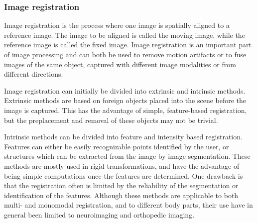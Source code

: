 
\subsubsection{Image registration}
Image registration is the process where one image is spatially aligned to a reference image. The image to be aligned is called the moving image, while the reference image is called the fixed image. Image registration  is an important part of image processing and can both be used to remove motion artifacts or to fuse images of the same object, captured with different image modalities or from different directions. 

Image registration can initially be divided into extrinsic and intrinsic methods. Extrinsic methods are based on foreign objects placed into the scene before the image is captured. This has the advantage of simple, feature-based registration, but the preplacement and removal of these objects may not be trivial. 

Intrinsic methods can be divided into feature and intensity based registration. Features can either be easily recognizable points identified by the user, or structures which can be extracted from the image by image segmentation. These methods are mostly used in rigid transformations, and have the advantage of being simple computations once the features are determined. One drawback is that the registration often is limited by the reliability of the segmentation or identification of the features. Although these methods are applicable to both multi- and monomodal registration, and to different body parts, their use have in general been limited to neuroimaging and orthopedic imaging\cite{Maintz1998}.

